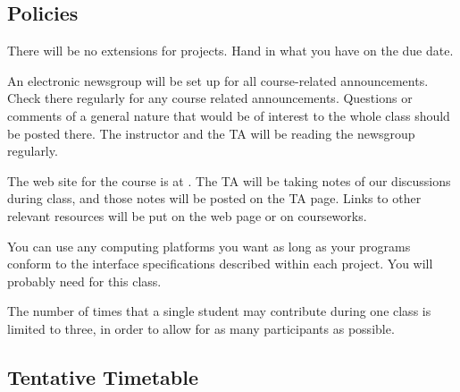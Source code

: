 \subsection*{Policies}

There will be no extensions for projects.  Hand in what you have on the due
date.

An electronic newsgroup will be set up for all course-related
announcements.  Check there regularly for
any course related announcements.  Questions or comments of a general
nature that would be of interest to the whole class should be posted
there.  The instructor and the TA will be reading the newsgroup
regularly.

The web site for the course is at
.
The TA will be taking notes of our discussions during class, and those
notes will be posted on the TA page.  Links to
other relevant resources will be
put on the web page or on courseworks.

You can use any computing platforms you want as long as your programs
conform to the interface specifications described within each project.
You will probably need  for this
class.

The number of times that a single student may contribute during one class
is limited to three, in order to allow for as many participants as possible.

\subsection*{Tentative Timetable}

